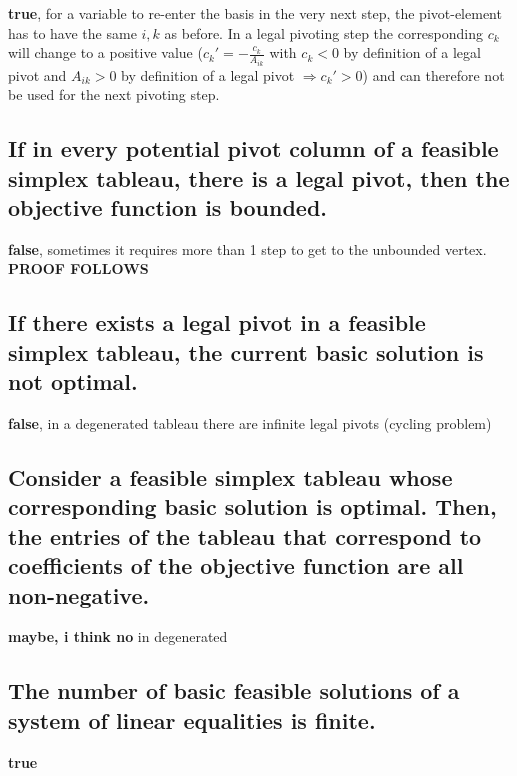 \documentclass[12pt, a4]{article}
\begin{document}
	\textbf{true}, for a variable to re-enter the basis in the very next step, the pivot-element has to have the same $i,k$ as before. In a legal pivoting step the corresponding $c_k$ will change to a positive value ($c_k' = -\frac{c_k}{A_{ik}}$ with $c_k < 0$ by definition of a legal pivot and $A_{ik} > 0$ by definition of a legal pivot $\Rightarrow c_k' > 0$) and can therefore not be used for the next pivoting step.
	\subsection{If in every potential pivot column of a feasible simplex tableau, there is a legal pivot, then the objective function is bounded.}
	\textbf{false}, sometimes it requires more than 1 step to get to the unbounded vertex. \textbf{PROOF FOLLOWS}
	\subsection{If there exists a legal pivot in a feasible simplex tableau, the current basic solution is not optimal.}
	\textbf{false}, in a degenerated tableau there are infinite legal pivots (cycling problem)
	\subsection{Consider a feasible simplex tableau whose corresponding basic solution is optimal. Then, the entries of the tableau that correspond to coefficients of the objective function are all non-negative.}
	\textbf{maybe, i think no} in degenerated
	\subsection{The number of basic feasible solutions of a system of linear equalities is finite.}
	\textbf{true}
	
\end{document}
